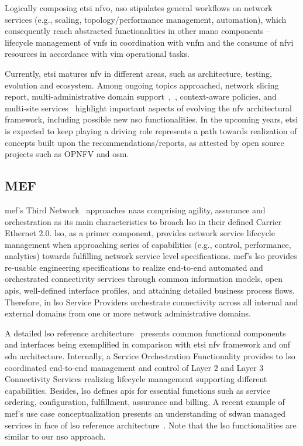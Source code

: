 Logically composing \gls{etsi} \gls{nfvo}, \gls{nso} stipulates general workflows on network services (e.g., scaling, topology/performance management, automation), which consequently reach abstracted functionalities in other \gls{mano} components -- lifecycle management of \glspl{vnf} in coordination with \gls{vnfm} and the consume of \gls{nfvi} resources in accordance with \gls{vim} operational tasks.

Currently, \gls{etsi} matures \gls{nfv} in different areas, such as architecture, testing, evolution and ecosystem. Among ongoing topics approached, network slicing report, multi-administrative domain support~\cite{ETSIIndustrySpecificationGroupISGNFV2014NetworkOptions},~\cite{ETSIGRDomains}, context-aware policies, and multi-site services~\cite{ETSIISGNFV2018} highlight important aspects of evolving the \gls{nfv} architectural framework, including possible new \gls{nso} functionalities. 
In the upcoming years, \gls{etsi} is expected to keep playing a driving role represents a path towards realization of concepts built upon the recommendations/reports, as attested by open source projects such as OPNFV and \gls{osm}.

\subsection{MEF}
\acrfull{mef}'s Third Network~\cite{MEF:Third:2015} approaches \gls{naas} comprising agility, assurance and orchestration as its main characteristics to broach \gls{lso} in their defined Carrier Ethernet 2.0. \gls{lso}, as a primer component, provides network service lifecycle management when approaching series of capabilities (e.g., control, performance, analytics) towards fulfilling network service level specifications. \acrfull{mef}'s \gls{lso} provides re-usable engineering specifications to realize end-to-end automated and orchestrated connectivity services through common information models, open \glspl{api}, well-defined interface profiles, and attaining detailed business process flows. Therefore, in \gls{lso} Service Providers orchestrate connectivity across all internal and external domains from one or more network administrative domains. 

A detailed \gls{lso} reference architecture~\cite{MEF:LSO:2016} presents common functional components and interfaces being exemplified in comparison with \gls{etsi} \gls{nfv} framework and \gls{onf} \gls{sdn} architecture. Internally, a Service Orchestration Functionality provides to \gls{lso} coordinated end-to-end management and control of Layer 2 and Layer 3 Connectivity Services realizing lifecycle management supporting different capabilities.
Besides, \gls{lso} defines \glspl{api} for essential functions such as service ordering, configuration, fulfillment, assurance and billing. A recent example of \gls{mef}'s use case conceptualization presents an understanding of \gls{sdwan} managed services in face of \gls{lso} reference architecture~\cite{MEF:SDWAN:2017}. Note that the \gls{lso} functionalities are similar to our \gls{nso} approach.


